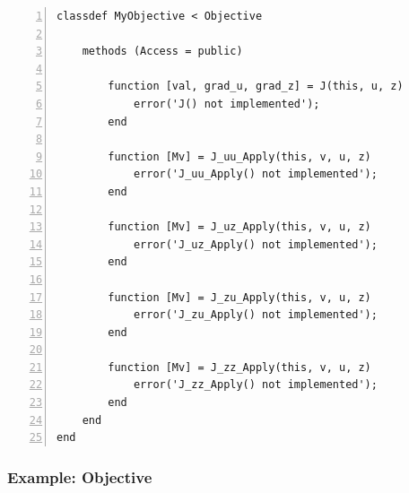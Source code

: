 \documentclass{article}
\begin{document}
\begin{lstlisting}[style=Matlab-editor,frame=single,numbers=left]
classdef MyObjective < Objective

    methods (Access = public)

        function [val, grad_u, grad_z] = J(this, u, z)
            error('J() not implemented');
        end

        function [Mv] = J_uu_Apply(this, v, u, z)
            error('J_uu_Apply() not implemented');
        end

        function [Mv] = J_uz_Apply(this, v, u, z)
            error('J_uz_Apply() not implemented');
        end

        function [Mv] = J_zu_Apply(this, v, u, z)
            error('J_zu_Apply() not implemented');
        end

        function [Mv] = J_zz_Apply(this, v, u, z)
            error('J_zz_Apply() not implemented');
        end
    end
end
\end{lstlisting}

\subsubsection*{Example: Objective}
\end{document}
